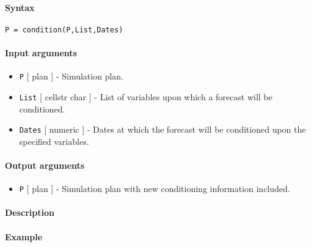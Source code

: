


	\paragraph{Syntax}\label{syntax}

\begin{verbatim}
P = condition(P,List,Dates)
\end{verbatim}

\paragraph{Input arguments}\label{input-arguments}

\begin{itemize}
\item
  \texttt{P} {[} plan {]} - Simulation plan.
\item
  \texttt{List} {[} cellstr \textbar{} char {]} - List of variables upon
  which a forecast will be conditioned.
\item
  \texttt{Dates} {[} numeric {]} - Dates at which the forecast will be
  conditioned upon the specified variables.
\end{itemize}

\paragraph{Output arguments}\label{output-arguments}

\begin{itemize}
\itemsep1pt\parskip0pt
\item
  \texttt{P} {[} plan {]} - Simulation plan with new conditioning
  information included.
\end{itemize}

\paragraph{Description}\label{description}

\paragraph{Example}\label{example}


